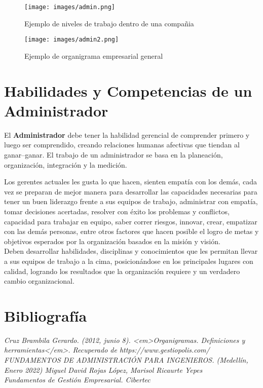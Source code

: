 \documentclass[letterpaper,12pt]{article}
\begin{document}
\begin{sloppypar}
\begin{figure}[H]
    \centering
    \texttt{[image: images/admin.png]}
    \caption{Ejemplo de niveles de trabajo dentro de una compañia}
    \texttt{[image: images/admin2.png]}
    \caption{Ejemplo de organigrama empresarial general}
\end{figure}
\newpage
\section{Habilidades y Competencias de un Administrador}
El \textbf{Administrador} debe tener la habilidad gerencial de comprender primero y luego ser comprendido, creando relaciones humanas afectivas que tiendan al ganar–ganar. El trabajo de un administrador se basa en la planeación, organización, integración y la medición.

Los gerentes actuales les gusta lo que hacen, sienten empatía con los demás, cada vez se preparan de mejor manera para desarrollar las capacidades necesarias para tener un buen liderazgo frente a sus equipos de trabajo, administrar con empatía, tomar decisiones acertadas, resolver con éxito los problemas y conflictos, capacidad para trabajar en equipo, saber correr riesgos, innovar, crear, empatizar con las demás personas, entre otros factores que hacen posible el logro de metas y objetivos esperados por la organización basados en la misión y visión. 
\vspace{0.3cm}\\ 
Deben desarrollar habilidades, disciplinas y conocimientos que les permitan llevar a sus equipos de trabajo a la cima, posicionándose en los principales lugares con calidad, logrando los resultados que la organización requiere y un verdadero cambio organizacional. 

\section{Bibliografía}
\textit{Cruz Brambila Gerardo. (2012, junio 8). <em>Organigramas. Definiciones y herramientas</em>. Recuperado de https://www.gestiopolis.com/}
\vspace{0.3cm}\\ 
\textit{FUNDAMENTOS DE ADMINISTRACIÓN PARA INGENIEROS. (Medellín, Enero 2022) Miguel David Rojas López, Marisol Ricaurte Yepes}
\vspace{0.3cm}\\ 
\textit{Fundamentos de Gestión Empresarial. Cibertec}        

\end{sloppypar}
\end{document}
